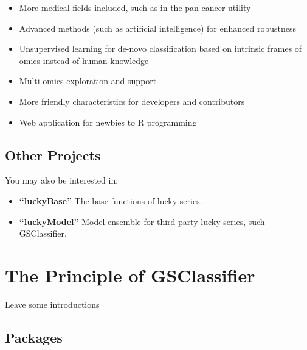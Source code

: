 \documentclass[
  12pt,
]{book}
\begin{document}
\begin{itemize}
\item
  More medical fields included, such as in the pan-cancer utility
\item
  Advanced methods (such as artificial intelligence) for enhanced robustness
\item
  Unsupervised learning for de-novo classification based on intrinsic frames of omics instead of human knowledge
\item
  Multi-omics exploration and support
\item
  More friendly characteristics for developers and contributors
\item
  Web application for newbies to R programming
\end{itemize}

\hypertarget{other-projects}{%
\section*{Other Projects}\label{other-projects}}

You may also be interested in:

\begin{itemize}
\item
  \textbf{``\href{https://github.com/huangwb8/luckyBase}{luckyBase}''} The base functions of lucky series.
\item
  \textbf{``\href{https://github.com/huangwb8/luckyModel}{luckyModel}''} Model ensemble for third-party lucky series, such GSClassifier.
\end{itemize}

\hypertarget{the-principle-of-gsclassifier}{%
\chapter{The Principle of GSClassifier}\label{the-principle-of-gsclassifier}}

Leave some introductions

\hypertarget{packages}{%
\section{Packages}\label{packages}}
\end{document}
